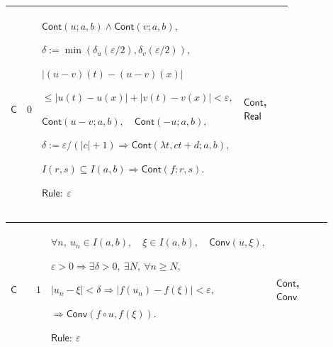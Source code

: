 \documentclass[12pt,reqno]{amsart}
\theoremstyle{blueplain}
\numberwithin{equation}{section}
\newlength{\FTCOneColumnBody}
\begin{document}
{\scriptsize \setlength{\parskip}{0pt}\nointerlineskip
\noindent 
\begin{tabular}{|@{}>{\centering\arraybackslash}m{\FTCOneColumnBody}|}
\hline
$\displaystyle \mathsf{Context\_C}:=$\par$\displaystyle a\le b,\quad\mathsf{%
Cont}(f;a,b).$ \\ \hline
\end{tabular}%
}

{\scriptsize \setlength{\parskip}{0pt}\nointerlineskip
\noindent 
\begin{tabular}{|@{}>{\centering\arraybackslash}m{0.10658\linewidth}|>{\centering\arraybackslash}m{0.03553\linewidth}|>{\centering\arraybackslash}m{0.52105\linewidth}|>{\centering\arraybackslash}m{0.23684\linewidth}|}
\hline
\hypertarget{proof:C0}{$\displaystyle \mathsf{C}$} & $\displaystyle 0$ & $%
\displaystyle \mathsf{Cont}(u;a,b)\land\mathsf{Cont}(v;a,b),$\par$%
\displaystyle \delta:=\min(\delta_u(\varepsilon/2),\delta_v(\varepsilon/2)),$%
\par$\displaystyle |(u-v)(t)-(u-v)(x)|$\par$\displaystyle %
{}\le|u(t)-u(x)|+|v(t)-v(x)|<\varepsilon,$\par$\displaystyle \mathsf{Cont}%
(u-v;a,b),\quad\mathsf{Cont}(-u;a,b),$\par$\displaystyle \delta:=%
\varepsilon/(|c|+1)\Rightarrow\mathsf{Cont}(\lambda t,ct+d;a,b),$\par$%
\displaystyle I(r,s)\subseteq I(a,b)\Rightarrow\mathsf{Cont}(f;r,s).$\par$%
\displaystyle \mathsf{Rule}:\ \varepsilon$ & \hyperlink{def:Cont}{$%
\displaystyle \mathsf{Cont}$}, \hyperlink{ax:Real}{$\displaystyle \mathsf{%
Real}$} \\ \hline
\end{tabular}%
}

{\scriptsize \setlength{\parskip}{0pt}\nointerlineskip
\noindent 
\begin{tabular}{|@{}>{\centering\arraybackslash}m{0.10658\linewidth}|>{\centering\arraybackslash}m{0.03553\linewidth}|>{\centering\arraybackslash}m{0.52105\linewidth}|>{\centering\arraybackslash}m{0.23684\linewidth}|}
\hline
\hypertarget{proof:C1}{$\displaystyle \mathsf{C}$} & $\displaystyle 1$ & $%
\displaystyle \forall n,\ u_n\in I(a,b),\quad\xi\in I(a,b),\quad\mathsf{Conv}%
(u,\xi),$\par$\displaystyle \varepsilon>0\Rightarrow\exists\delta>0,\
\exists N,\ \forall n\ge N,$\par$\displaystyle |u_n-\xi|<\delta%
\Rightarrow|f(u_n)-f(\xi)|<\varepsilon,$\par$\displaystyle \Rightarrow%
\mathsf{Conv}(f\circ u,f(\xi)).$\par$\displaystyle \mathsf{Rule}:\
\varepsilon$ & \hyperlink{def:Cont}{$\displaystyle \mathsf{Cont}$}, 
\hyperlink{def:Conv}{$\displaystyle \mathsf{Conv}$} \\ \hline
\end{tabular}%
}
\end{document}
